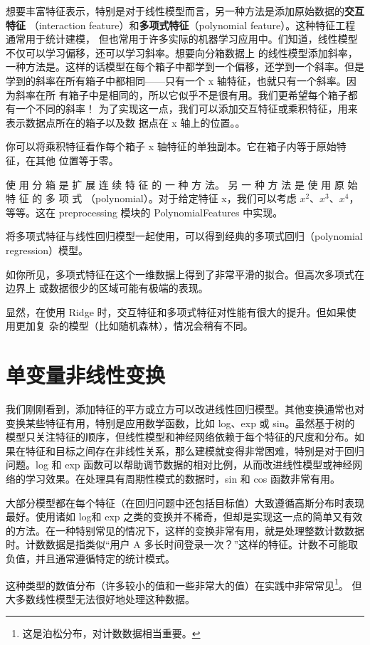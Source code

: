 想要丰富特征表示，特别是对于线性模型而言，另一种方法是添加原始数据的\textbf{交互特征}
（interaction feature）和\textbf{多项式特征}（polynomial feature）。这种特征工程通常用于统计建模，
但也常用于许多实际的机器学习应用中。们知道，线性模型不仅可以学习偏移，还可以学习斜率。想要向分箱数据上
的线性模型添加斜率，一种方法是。这样的话模型在每个箱子中都学到一个偏移，还学到一个斜率。但是学到的斜率在所有箱子中都相同——只有一个 x 轴特征，也就只有一个斜率。因为斜率在所
有箱子中是相同的，所以它似乎不是很有用。我们更希望每个箱子都有一个不同的斜率！
为了实现这一点，我们可以添加交互特征或乘积特征，用来表示数据点所在的箱子以及数
据点在 x 轴上的位置。。

你可以将乘积特征看作每个箱子 x 轴特征的单独副本。它在箱子内等于原始特征，在其他
位置等于零。

使 用 分 箱 是 扩 展 连 续 特 征 的 一 种 方 法。 另 一 种 方 法 是 使 用 原 始 特 征 的 多 项 式
（polynomial）。对于给定特征 x，我们可以考虑 $x^2$、$x^3$、$x^4$，等等。这在
preprocessing 模块的 PolynomialFeatures 中实现。

将多项式特征与线性回归模型一起使用，可以得到经典的多项式回归（polynomial
regression）模型。

如你所见，多项式特征在这个一维数据上得到了非常平滑的拟合。但高次多项式在边界上
或数据很少的区域可能有极端的表现。

显然，在使用 Ridge 时，交互特征和多项式特征对性能有很大的提升。但如果使用更加复
杂的模型（比如随机森林），情况会稍有不同。
\section{单变量非线性变换}
我们刚刚看到，添加特征的平方或立方可以改进线性回归模型。其他变换通常也对变换某些特征有用，特别是应用数学函数，比如 log、exp 或 sin。虽然基于树的模型只关注特征的顺序，但线性模型和神经网络依赖于每个特征的尺度和分布。如果在特征和目标之间存在非线性关系，那么建模就变得非常困难，特别是对于回归问题。log 和 exp 函数可以帮助调节数据的相对比例，从而改进线性模型或神经网络的学习效果。在处理具有周期性模式的数据时，sin 和 cos 函数非常有用。

大部分模型都在每个特征（在回归问题中还包括目标值）大致遵循高斯分布时表现最好。使用诸如 log和 exp 之类的变换并不稀奇，但却是实现这一点的简单又有效的方法。在一种特别常见的情况下，这样的变换非常有用，就是处理整数计数数据时。计数数据是指类似“用户 A 多长时间登录一次？”这样的特征。计数不可能取负值，并且通常遵循特定的统计模式。

这种类型的数值分布（许多较小的值和一些非常大的值）在实践中非常常见\footnote{这是泊松分布，对计数数据相当重要。}。 但大多数线性模型无法很好地处理这种数据。

